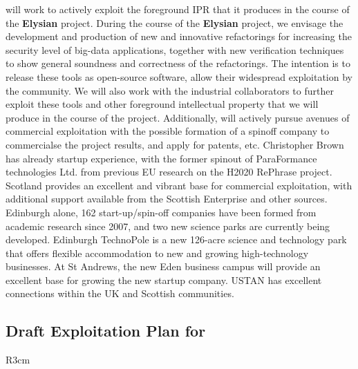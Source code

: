 \documentclass[a4paper,11pt]{article}
\newcommand{\project}[1]{\textbf{#1}\xspace}
\newcommand{\SECURITY}{\project{Elysian}}
\newcommand{\TheProject}{\SECURITY}
\begin{document}
\SAshort{} will work to actively exploit the foreground IPR that it produces in the course of the \TheProject{} project. During the course of the \TheProject{} project, we envisage the development and production of new and innovative refactorings for increasing the security level of big-data applications, together with new verification techniques to show general soundness and correctness of the refactorings. The intention is to release these tools as open-source software, allow their widespread exploitation by the community. We will also work with the industrial collaborators to further exploit these tools and other foreground intellectual property that we will produce in the course of the project. 
Additionally, \SAshort{} will actively pursue avenues of commercial exploitation with the possible formation of a spinoff company to commercialse the project results, and apply for patents, etc. Christopher Brown has already startup experience, with the former spinout of ParaFormance technologies Ltd. from previous EU research on the H2020 RePhrase project. Scotland provides an excellent and vibrant base for commercial exploitation, with additional support available from the Scottish Enterprise and other sources.  Edinburgh alone, 162 start-up/spin-off companies have been formed from academic research since 2007, and two new science parks are currently being developed. Edinburgh TechnoPole is a new 126-acre science and technology park that offers flexible accommodation to new and growing high-technology businesses. At St Andrews, the new Eden business campus will provide an excellent base for growing the new startup company. USTAN has excellent connections within the UK and Scottish communities.

\horizontalline

\subsection*{Draft Exploitation Plan for \UODshort{}}

\begin{wrapfigure}{R}{3cm}
\vspace{-1.4cm}
\hfill {}
\vspace{-0.9cm}
\end{wrapfigure}
\end{document}
